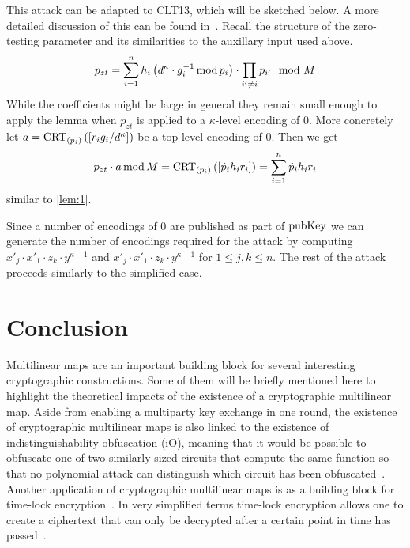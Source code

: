 \documentclass[english]{scrartcl}
\theoremstyle{plain}
\theoremstyle{definition}
\begin{document}
    This attack can be adapted to CLT13, which will be sketched below. A more detailed discussion of this can be found in~\cite{cryptoeprint:2014:906}.
    Recall the structure of the zero-testing parameter and its similarities to the auxillary input used above.
    \begin{equation*}
        p_{zt} = \sum_{i=1}^n h_i \left(d^\kappa \cdot g_i^{-1} \operatorname{mod} p_i\right) \cdot \prod_{i' \neq i} p_{i'} \mod M
    \end{equation*}
    While the coefficients might be large in general they remain small enough to apply the lemma when $p_{zt}$ is applied to a $\kappa$-level encoding of 0.
    More concretely let $a = \operatorname{CRT}_{(p_{i})}\left(\left[r_i g_i / d^\kappa\right]\right)$ be a top-level encoding of 0. Then we get
    \begin{equation}\label{eq:CHLRS_clt13}
        p_{zt} \cdot a \operatorname{mod} M = \operatorname{CRT}_{(p_{i})}\left(\left[\hat{p}_i h_i r_i\right]\right) = \sum_{i = 1}^n \hat{p}_i h_i r_i
    \end{equation}
    similar to \cref{lem:1}.

    Since a number of encodings of 0 are published as part of $\mathrm{pubKey}$ we can generate the number of encodings required for the attack by computing $x'_j \cdot x'_1 \cdot z_k \cdot y^{\kappa - 1}$ and $x'_j \cdot x'_1 \cdot z_k \cdot y^{\kappa - 1}$ for $1 \leq j, k \leq n$.
    The rest of the attack proceeds similarly to the simplified case.

    \section{Conclusion}
    Multilinear maps are an important building block for several interesting cryptographic constructions. Some of them will be briefly mentioned here to highlight the theoretical impacts of the existence of a cryptographic multilinear map.
    Aside from enabling a multiparty key exchange in one round, the existence of cryptographic multilinear maps is also linked to the existence of indistinguishability obfuscation (iO), meaning that it would be possible to obfuscate one of two similarly sized circuits that compute the same function so that no polynomial attack can distinguish which circuit has been obfuscated~\cite{albrecht2020multilinear}.
    Another application of cryptographic multilinear maps is as a building block for time-lock encryption~\cite{liu2018build}. In very simplified terms time-lock encryption allows one to create a ciphertext that can only be decrypted after a certain point in time has passed~\cite{liu2018build}.
\end{document}
